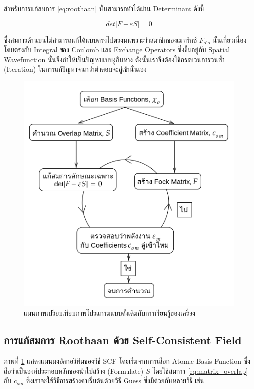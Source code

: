 สำหรับการแก้สมการ \ref{eq:roothaan} นั้นสามารถทำได้ผ่าน Determinant ดังนี้

\begin{equation}
    \label{eq:scf_secular}
    det|F - \varepsilon S| = 0
\end{equation}

ซึ่งสมการด้านบนไม่สามารถแก้ได้แบบตรงไปตรงมาเพราะว่าสมาชิกของเมทริกซ์ $F_{o'o}$ นั้นเกี่ยวเนื่องโดยตรงกับ Integral ของ Coulomb และ Exchange Operators
ซึ่งขึ้นอยู่กับ Spatial Wavefunction นั่นจึงทำให้เป็นปัญหาแบบงูกินหาง ดังนั้นเราจึงต้องใช้กระบวนการวนซ้ำ (Iteration) ในการแก้ปัญหาจนกว่าตำตอบจะลู่เข้านั่นเอง

\begin{figure}[!htb]
    \centering
    \includegraphics[width=0.8\linewidth]{fig/ch7-scf.png}
    \caption{แผนภาพเปรียบเทียบภาพโปรแกรมแบบดั้งเดิมกับการเรียนรู้ของเครื่อง}
    \label{fig:scf}
\end{figure}

\subsection{การแก้สมการ Roothaan ด้วย Self-Consistent Field}

ภาพที่ \ref{fig:scf} แสดงแผนผงอัลกอริทึมของวิธี SCF โดยเริ่มจากการเลือก Atomic Basis Function ซึ่งถือว่าเป็นองค์ประกอบหลักของนำไปสร้าง (Formulate) 
$S$ โดยใช้สมการ \ref{eq:matrix_overlap} กับ $c_{om}$ ซึ่งเราจะใช้วิธีการสร้างค่าเริ่มต้นด้วยวิธี Guess ซึ่งมีด้วยกันหลายวิธี เช่น

